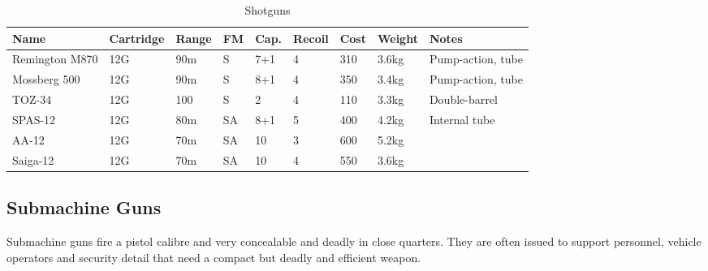 \begin{table}
  \label{tab:Shotguns}
  \caption{Shotguns}
  \begin{center}
    \begin{tabular}{| l | l | l | l | l | l | l | l | l |}
      \hline
      \textbf{Name} & \textbf{Cartridge} & \textbf{Range} &
      \textbf{FM} & \textbf{Cap.} & \textbf{Recoil} &
      \textbf{Cost} & \textbf{Weight} & \textbf{Notes} \\ \hline

      Remington M870 & 12G & 90m & S  & 7+1 & 4 & 310 & 3.6kg & Pump-action, tube \\ \hline
      Mossberg 500   & 12G & 90m & S  & 8+1 & 4 & 350 & 3.4kg & Pump-action, tube \\ \hline
      TOZ-34         & 12G & 100 & S  & 2   & 4 & 110 & 3.3kg & Double-barrel \\ \hline
      SPAS-12        & 12G & 80m & SA & 8+1 & 5 & 400 & 4.2kg & Internal tube \\ \hline
      AA-12          & 12G & 70m & SA & 10  & 3 & 600 & 5.2kg & \\ \hline
      Saiga-12       & 12G & 70m & SA & 10  & 4 & 550 & 3.6kg & \\ \hline

    \end{tabular}
  \end{center}
\end{table}

\subsection{Submachine Guns}
\label{sub:10-Submachine Guns}

Submachine guns fire a pistol calibre and very concealable and deadly in close
quarters. They are often issued to support personnel, vehicle operators and
security detail that need a compact but deadly and efficient weapon.

